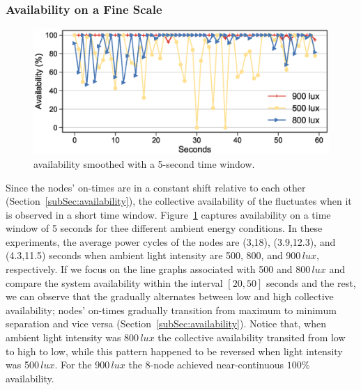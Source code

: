 \subsubsection{Availability on a Fine Scale}
%
\begin{figure}[t]
    \centering
     \includegraphics[width=\columnwidth]{figures/sysAvailabilityTimeline_470_sleep_5seconds_2}
    \caption{\cis availability smoothed with a 5-second time window.}
    \label{fig:fineScaleAvailability}
\end{figure}
Since the nodes' on-times are in a constant shift relative to each other (Section~\ref{subSec:availability}), the collective availability of the \cis fluctuates when it is observed in a short time window. 
Figure~\ref{fig:fineScaleAvailability} captures \cis availability on a time window of 5 seconds for thee different ambient energy conditions. In these experiments, the average power cycles of the \cis nodes are (3,18), (3.9,12.3), and (4.3,11.5) seconds when ambient light intensity are 500, 800, and 900\,$\si{lux}$, respectively. 
If we focus on the line graphs associated with 500 and 800\,$\si{lux}$ and compare the system availability within the interval $[20,50]$ seconds and the rest, we can observe that the \cis gradually alternates between low and high collective availability; nodes' on-times gradually transition from maximum to minimum separation and vice versa (Section~\ref{subSec:availability}). Notice that, when ambient light intensity was 800\,$\si{lux}$ the \cis collective availability transited from low to high to low, while this pattern happened to be reversed when light intensity was  500\,$\si{lux}$. For the 900\,$\si{lux}$ the 8-node \cis achieved near-continuous $100\%$ availability. 
%
